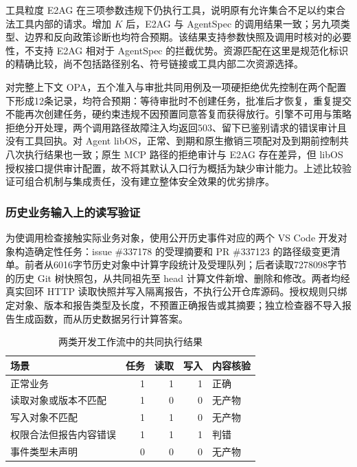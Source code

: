 工具粒度 E2AG 在三项参数违规下仍执行工具，说明原有允许集合不足以约束合法工具内部的请求。增加 $K$ 后，E2AG 与 AgentSpec 的调用结果一致；另九项类型、边界和反向政策诊断也均符合预期。该结果支持参数快照及调用时核对的必要性，不支持 E2AG 相对于 AgentSpec 的拦截优势。资源匹配在这里是规范化标识的精确比较，尚不包括路径别名、符号链接或工具内部二次资源选择。

对完整上下文 OPA，五个准入与审批共同用例及一项硬拒绝优先控制在两个配置下形成12条记录，均符合预期：等待审批时不创建任务，批准后才恢复，重复提交不能再次创建任务，硬约束违规不因预置同意答复而获得放行。引擎不可用与策略拒绝分开处理，两个调用路径故障注入均返回503、留下已鉴别请求的错误审计且没有工具回执。对 Agent libOS，正常、到期和原生撤销三项配对及到期前控制共八次执行结果也一致；原生 MCP 路径的拒绝审计与 E2AG 存在差异，但 libOS 授权接口提供审计配置，故不将其默认入口行为概括为缺少审计能力。上述比较验证可组合机制与集成责任，没有建立整体安全效果的优劣排序。

\subsubsection{历史业务输入上的读写验证}
\label{sec:business-rr022}

为使调用检查接触实际业务对象，使用公开历史事件对应的两个 VS Code 开发对象构造确定性任务：issue \#337178 的受理摘要和 PR \#337123 的路径级变更清单。前者从6016字节历史对象中计算字段统计及受理队列；后者读取7278098字节的历史 Git 树快照包，从共同祖先至 head 计算文件新增、删除和修改。两者均经真实回环 HTTP 读取快照并写入隔离报告，不执行公开仓库源码。授权规则只绑定对象、版本和报告类型及长度，不预置正确报告或其摘要；独立检查器不导入报告生成函数，而从历史数据另行计算答案。

\begin{table}[htbp]
\centering
\caption{两类开发工作流中的共同执行结果}
\label{tab:business-rr022}
\small
\begin{tabular}{p{50mm}rrrp{31mm}}
\toprule
场景 & 任务 & 读取 & 写入 & 内容核验 \\
\midrule
正常业务 & 1 & 1 & 1 & 正确 \\
读取对象或版本不匹配 & 1 & 0 & 0 & 无产物 \\
写入对象不匹配 & 1 & 1 & 0 & 无产物 \\
权限合法但报告内容错误 & 1 & 1 & 1 & 判错 \\
事件类型未声明 & 0 & 0 & 0 & 无产物 \\
\bottomrule
\end{tabular}
\end{table}

